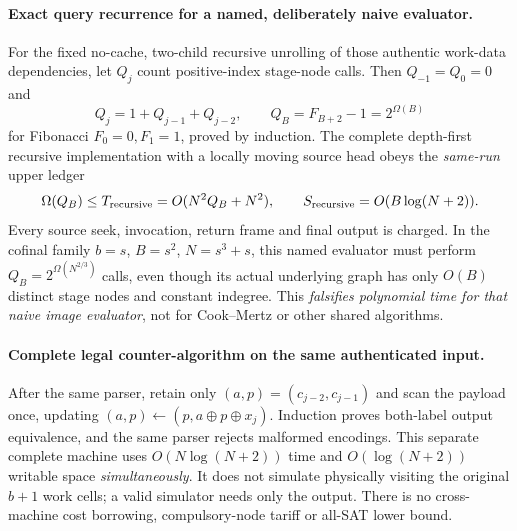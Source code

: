 \documentclass[11pt]{article}
\begin{document}
\paragraph{Exact query recurrence for a named, deliberately naive evaluator.}
For the fixed no-cache, two-child recursive unrolling of those
authentic work-data dependencies, let $Q_j$ count positive-index
stage-node calls. Then $Q_{-1}=Q_0=0$ and
\[
Q_j=1+Q_{j-1}+Q_{j-2},
\qquad
\boxed{Q_B=F_{B+2}-1=2^{\Omega(B)}}
\]
for Fibonacci $F_0=0,F_1=1$, proved by induction.
The complete depth-first recursive implementation with a
locally moving source head obeys the \emph{same-run} upper ledger
\[
 \Omega(Q_B)\le T_{\rm recursive}=O(N^2 Q_B+N^2),\qquad
 S_{\rm recursive}=O(B\log(N+2)).
\]
Every source seek, invocation, return frame and final output is
charged. In the cofinal family $b=s$, $B=s^2$, $N=s^3+s$,
this named evaluator must perform
$Q_B=2^{\Omega(N^{2/3})}$ calls, even though its actual
underlying graph has only $O(B)$ distinct stage nodes and
constant indegree. This \emph{falsifies polynomial time for
that naive image evaluator}, not for Cook--Mertz or other
shared algorithms.

\paragraph{Complete legal counter-algorithm on the same authenticated input.}
After the same parser, retain only
$(a,p)=(c_{j-2},c_{j-1})$ and scan the payload once,
updating $(a,p)\leftarrow(p,a\oplus p\oplus x_j)$.
Induction proves both-label output equivalence, and the same
parser rejects malformed encodings. This separate complete
machine uses $O(N\log(N+2))$ time and
$O(\log(N+2))$ writable space \emph{simultaneously}.
It does not simulate physically visiting the original
$b+1$ work cells; a valid simulator needs only the output.
There is no cross-machine cost borrowing, compulsory-node
tariff or all-SAT lower bound.
\end{document}
